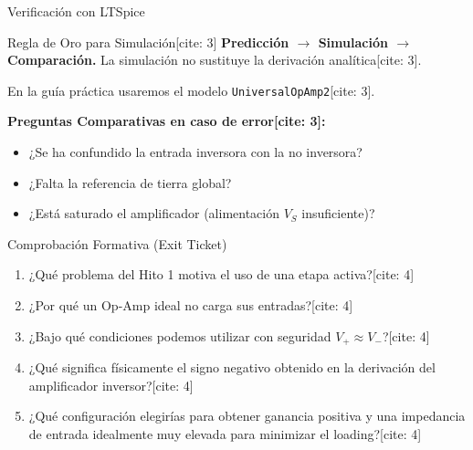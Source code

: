 \documentclass[aspectratio=169, table, xcdraw]{beamer}
\begin{document}
\begin{frame}{Verificación con LTSpice}
    \begin{block}{Regla de Oro para Simulación[cite: 3]}
        \textbf{Predicción $\rightarrow$ Simulación $\rightarrow$ Comparación.} La simulación no sustituye la derivación analítica[cite: 3].
    \end{block}
    
    En la guía práctica usaremos el modelo \texttt{UniversalOpAmp2}[cite: 3].
    
    \vspace{0.2cm}
    \textbf{Preguntas Comparativas en caso de error[cite: 3]:}
    \begin{itemize}
        \item ¿Se ha confundido la entrada inversora con la no inversora?
        \item ¿Falta la referencia de tierra global?
        \item ¿Está saturado el amplificador (alimentación $V_S$ insuficiente)?
    \end{itemize}
\end{frame}

\begin{frame}{Comprobación Formativa (Exit Ticket)}
    \begin{tcolorbox}[colback=white, colframe=ucbblue, title=Consolidación Rápida]
        \begin{enumerate}
            \item ¿Qué problema del Hito 1 motiva el uso de una etapa activa?[cite: 4]
            \item ¿Por qué un Op-Amp ideal no carga sus entradas?[cite: 4]
            \item ¿Bajo qué condiciones podemos utilizar con seguridad $V_+ \approx V_-$?[cite: 4]
            \item ¿Qué significa físicamente el signo negativo obtenido en la derivación del amplificador inversor?[cite: 4]
            \item ¿Qué configuración elegirías para obtener ganancia positiva y una impedancia de entrada idealmente muy elevada para minimizar el loading?[cite: 4]
        \end{enumerate}
    \end{tcolorbox}
\end{frame}
\end{document}
